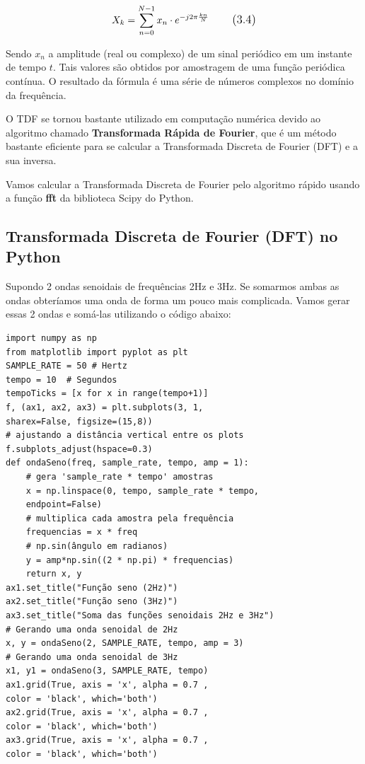 \begin{equation}
\large X_{k} = \sum_{n = 0}^{N-1} x_{n} \cdot e^{-j2\pi\frac{kn}{N}}
\tag{3.4}  
\end{equation}

Sendo $x_{n}$ a amplitude (real ou complexo) de um sinal periódico em um instante de tempo $t$. Tais valores são obtidos por amostragem de uma função periódica contínua. O resultado da fórmula é uma série de números complexos no domínio da frequência.

O TDF se tornou bastante utilizado em computação numérica devido ao algoritmo chamado \textbf{Transformada Rápida de Fourier}, que é um método bastante eficiente para se calcular a Transformada Discreta de Fourier (DFT) e a sua inversa. 

Vamos calcular a Transformada Discreta de Fourier pelo algoritmo rápido usando a função \textbf{fft} da biblioteca Scipy do Python.

\subsection {Transformada Discreta de Fourier (DFT) no Python}
Supondo 2 ondas senoidais de frequências 2Hz e 3Hz. Se somarmos ambas as ondas obteríamos uma onda de forma um pouco mais complicada. Vamos gerar essas 2 ondas e somá-las utilizando o código abaixo:

\begin{verbatim}
import numpy as np
from matplotlib import pyplot as plt
SAMPLE_RATE = 50 # Hertz
tempo = 10  # Segundos
tempoTicks = [x for x in range(tempo+1)]
f, (ax1, ax2, ax3) = plt.subplots(3, 1, 
sharex=False, figsize=(15,8))
# ajustando a distância vertical entre os plots
f.subplots_adjust(hspace=0.3)
def ondaSeno(freq, sample_rate, tempo, amp = 1):
	# gera 'sample_rate * tempo' amostras
	x = np.linspace(0, tempo, sample_rate * tempo, 
	endpoint=False)
	# multiplica cada amostra pela frequência
	frequencias = x * freq
	# np.sin(ângulo em radianos)
	y = amp*np.sin((2 * np.pi) * frequencias)
	return x, y
ax1.set_title("Função seno (2Hz)")
ax2.set_title("Função seno (3Hz)")
ax3.set_title("Soma das funções senoidais 2Hz e 3Hz")
# Gerando uma onda senoidal de 2Hz
x, y = ondaSeno(2, SAMPLE_RATE, tempo, amp = 3)
# Gerando uma onda senoidal de 3Hz
x1, y1 = ondaSeno(3, SAMPLE_RATE, tempo)
ax1.grid(True, axis = 'x', alpha = 0.7 , 
color = 'black', which='both')
ax2.grid(True, axis = 'x', alpha = 0.7 , 
color = 'black', which='both')
ax3.grid(True, axis = 'x', alpha = 0.7 , 
color = 'black', which='both')
\end{verbatim}

